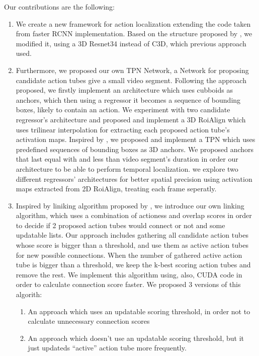 Our contributions are the following:
\begin{enumerate}
\item We create a new framework for action localization extending the code taken from faster RCNN implementation. Based on the structure
  proposed by \cite{DBLP:journals/corr/HouCS17}, we modified it, using a 3D Resnet34 instead of C3D, which previous approach used.

\item Furthermore, we proposed our own TPN Network, a Network for proposing candidate action tubes give a small video segment.
  Following the approach \cite{DBLP:journals/corr/HouCS17} proposed, we firstly implement an architecture which uses
  cubboids as anchors, which then using a regressor it becomes a sequence of bounding boxes, likely to contain an action.
  We experiment with two candidate regressor's architecture and proposed and implement a 3D RoiAlign which uses trilinear
  interpolation for extracting each proposed action tube's activation maps. 
  Inspired by \cite{DBLP:journals/corr/abs-1712-09184}, we proposed and implement a TPN which uses predefined sequences of bounding
  boxes as 3D anchors. We proposed anchors that last equal with and less than video segment's duration in order our architecture to be able to
  perform temporal localization.  we explore two different regressors' architectures for better spatial precision using activation
  maps extracted from 2D RoiAlign, treating each frame seperatly.
\item Inspired by liniking algorithm proposed by \cite{DBLP:journals/corr/HouCS17}, we introduce our own linking algorithm, which
  uses a combination of actioness and overlap scores in order to decide if 2 proposed action tubes would connect or not and some updatable lists.
  Our approach includes gathering all candidate action tubes whose score is bigger than a threshold, and use them as active action tubes for
  new possible connections. When the number of gathered active action tube is bigger than a threshold, we keep the k-best scoring action tubes
  and remove the rest.  We implement this algorithm using, also, CUDA code in order to calculate connection score faster. We proposed 3 versions of this algorith:
  \begin{enumerate}
  \item An approach which uses an updatable scoring threshold, in order not to calculate unnecessary connection scores
  \item An approach which doesn't use an updatable scoring threshold, but it just updateds ``active'' action tube more frequently.

\end{enumerate}
\end{enumerate}
